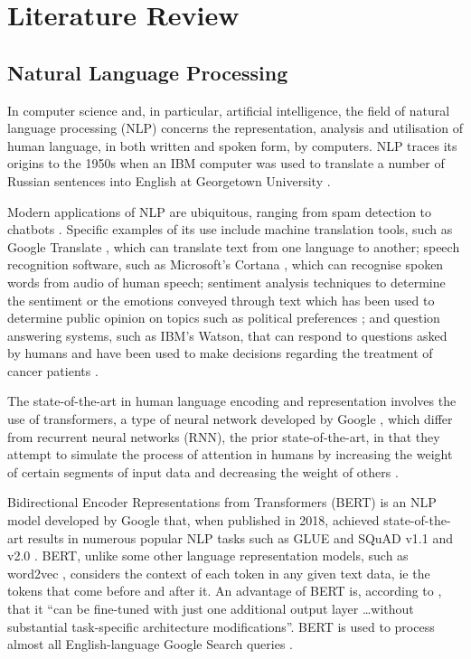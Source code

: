 \chapter{Literature Review}  \label{sec:LR}

\section{Natural Language Processing} \label{sec:LR_NLP}

In computer science and, in particular, artificial intelligence, the field of natural language processing (NLP) concerns the representation, analysis and utilisation of human language, in both written and spoken form, by computers. NLP traces its origins to the 1950s when an IBM computer was used to translate a number of Russian sentences into English at Georgetown University \cite{Hutchins2004_MT}.

Modern applications of NLP are ubiquitous, ranging from spam detection \cite{Jindal2007_Spam} to chatbots \cite{Adamopoulou2020_Chatbot}. Specific examples of its use include machine translation tools, such as Google Translate \cite{GoogleTranslate}, which can translate text from one language to another; speech recognition software, such as Microsoft's Cortana \cite{MicrosoftSpeechRecognition}, which can recognise spoken words from audio of human speech; sentiment analysis techniques to determine the sentiment or the emotions conveyed through text which has been used to determine public opinion on topics such as political preferences \cite{Ceron2014_Sentiment}; and question answering systems, such as IBM's Watson, that can respond to questions asked by humans and have been used to make decisions regarding the treatment of cancer patients \cite{AOCNP2015_Watson}.

The state-of-the-art in human language encoding and representation involves the use of transformers, a type of neural network developed by Google \cite{Vaswani2017_Transformers}, which differ from recurrent neural networks (RNN), the prior state-of-the-art, in that they attempt to simulate the process of attention in humans by increasing the weight of certain segments of input data and decreasing the weight of others \cite{Bahdanau2014_Attention}.

Bidirectional Encoder Representations from Transformers (BERT) is an NLP model developed by Google that, when published in 2018, achieved state-of-the-art results in numerous popular NLP tasks such as GLUE and SQuAD v1.1 and v2.0 \cite{Devlin2018_BERT}. BERT, unlike some other language representation models, such as word2vec \cite{Mikolov2013_W2V}, considers the context of each token in any given text data, ie the tokens that come before and after it. An advantage of BERT is, according to \cite{Devlin2018_BERT}, that it ``can be fine-tuned with just one additional output layer \ldots without substantial task-specific architecture modifications''. BERT is used to process almost all English-language Google Search queries \cite{GoogleSearchBERT}.


